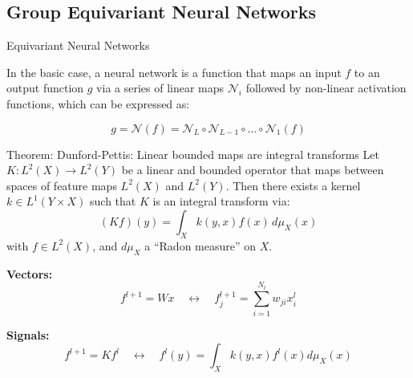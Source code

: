 \documentclass[9pt,dvipsnames]{beamer}
\begin{document}
\subsection{Group Equivariant Neural Networks}
\begin{frame}{Equivariant Neural Networks}

	In the basic case, a neural network is a function that maps an input \( f \) to an output function \( g \) via a series of linear maps \( \mathcal{N}_i \) followed by non-linear activation functions, which can be expressed as:

	\begin{equation}
		g = \mathcal{N}(f) = \mathcal{N}_L \circ \mathcal{N}_{L-1} \circ \ldots \circ \mathcal{N}_1(f)
	\end{equation}

	\begin{block}{Theorem: Dunford-Pettis: Linear bounded maps are integral transforms}
		Let \( K : L^2(X) \rightarrow L^2(Y) \) be a linear and bounded operator that maps between spaces of feature maps \( L^2(X) \) and \( L^2(Y) \). Then there exists a kernel \( k \in L^1(Y \times X) \) such that \( K \) is an integral transform via:
		\begin{equation*}
			(Kf)(y) = \int_X k(y, x) f(x) \, d\mu_X(x)
		\end{equation*}
		with \( f \in L^2(X) \), and \( d\mu_X \) a ``Radon measure'' on \( X \).
	\end{block}

	\textbf{Vectors:}
	\begin{equation}
		f^{l+1} = Wx \quad \leftrightarrow \quad f^{l+1}_j = \sum_{i=1}^{N_l} w_{ji} x^l_i
	\end{equation}

	\textbf{Signals:}
	\begin{equation}
		f^{l+1} = K f^l \quad \leftrightarrow \quad f^l(y) = \int_X k(y, x) f^l(x) d\mu_X(x)
	\end{equation}

\end{frame}
\end{document}
